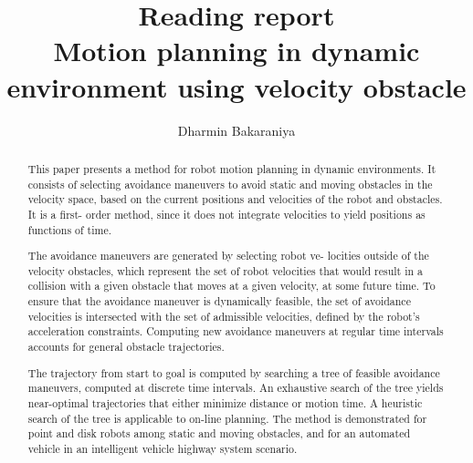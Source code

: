 \documentclass[12pt]{article}
\title{Reading report\\Motion planning in dynamic environment using velocity obstacle\cite{fiorini}}
\author{Dharmin Bakaraniya}
\begin{document}
\maketitle{}
\begin{abstract}
This paper presents a method for robot motion planning in dynamic
environments. It consists of selecting avoidance maneuvers to avoid
static and moving obstacles in the velocity space, based on the current positions and velocities of the robot and obstacles. It is a first-
order method, since it does not integrate velocities to yield positions
as functions of time.

The avoidance maneuvers are generated by selecting robot ve-
locities outside of the velocity obstacles, which represent the set of
robot velocities that would result in a collision with a given obstacle
that moves at a given velocity, at some future time. To ensure that
the avoidance maneuver is dynamically feasible, the set of avoidance
velocities is intersected with the set of admissible velocities, defined
by the robot’s acceleration constraints. Computing new avoidance
maneuvers at regular time intervals accounts for general obstacle
trajectories.

The trajectory from start to goal is computed by searching a tree of
feasible avoidance maneuvers, computed at discrete time intervals.
An exhaustive search of the tree yields near-optimal trajectories that
either minimize distance or motion time. A heuristic search of the
tree is applicable to on-line planning. The method is demonstrated
for point and disk robots among static and moving obstacles, and
    for an automated vehicle in an intelligent vehicle highway system
scenario.
\end{abstract}
\end{document}
